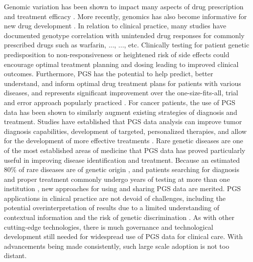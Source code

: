 \documentclass[a4paper,11pt]{article}
\begin{document}
Genomic variation has been shown to impact many aspects of drug prescription and treatment efficacy \cite{feero_genomics_2011}. 
More recently, genomics has also become informative for new drug development \cite{ko_new_2022}. 
In relation to clinical practice, many studies have documented genotype correlation with unintended drug responses for commonly prescribed drugs such as warfarin, ..., ..., etc. 
Clinically testing for patient genetic predisposition to non-responsiveness or heightened risk of side effects could encourage optimal treatment planning and dosing leading to improved clinical outcomes. 
Furthermore, PGS has the potential to help predict, better understand, and inform optimal drug treatment plans for patients with various diseases, and represents significant improvement over the one-size-fits-all, trial and error approach popularly practiced \cite{hens_return_2011}. 
For cancer patients, the use of PGS data has been shown to similarly augment existing strategies of diagnosis and treatment. Studies have established that PGS data analysis can improve tumor diagnosis capabilities, development of targeted, personalized therapies, and allow for the development of more effective treatments \cite{mcleod_cancer_2013}. 
Rare genetic diseases are one of the most established areas of medicine that PGS data has proved particularly useful in improving disease identification and treatment. 
Because an estimated 80\% of rare diseases are of genetic origin \cite{zhu_whole-exome_2015}, and patients searching for diagnosis and proper treatment commonly undergo years of testing at more than one institution \cite{marwaha_guide_2022}, new approaches for using and sharing PGS data are merited. 
PGS applications in clinical practice are not devoid of challenges, including the potential overinterpretation of results due to a limited understanding of contextual information and the risk of genetic discrimination \cite{alzubi_personal_2014}. 
As with other cutting-edge technologies, there is much governance and technological development still needed for widespread use of PGS data for clinical care. 
With advancements being made consistently, such large scale adoption is not too distant.
\end{document}
